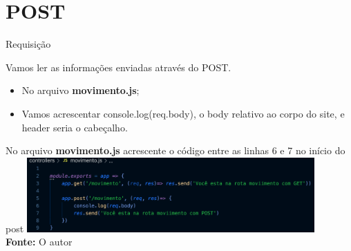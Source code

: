 \documentclass{beamer}
\begin{document}
\section{POST}
    \begin{frame}[label=lists]{Requisição}

         Vamos ler as informações enviadas através do POST.
         \begin{itemize}
         \item No arquivo \textbf{movimento.js};
         \item Vamos acrescentar \alert{console.log(req.body)}, o body relativo ao corpo do site, e header seria o cabeçalho.
         \end{itemize}
          \vspace{0.5cm}
          No arquivo \textbf{movimento.js} acrescente o código entre as linhas 6 e 7 no início do post
%
	            \includegraphics[width=110mm]{resources/aula5_1.png}\\
            \tiny{\textbf{Fonte:} O autor}
    \end{frame}
\end{document}
